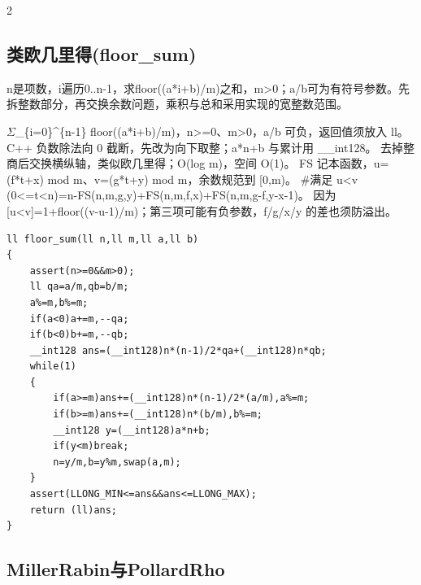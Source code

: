 \documentclass[UTF8,fontset=fandol,a4paper,twoside]{ctexart}
\newcommand{\note}[1]{{\fontsize{10}{12}\selectfont #1\par}}
\begin{document}
\begin{multicols}{2}
\subsection{类欧几里得(floor\_sum)}

\note{n是项数，i遍历0.\allowbreak{}.\allowbreak{}n-\allowbreak{}1，求floor(\allowbreak{}(\allowbreak{}a*i+\allowbreak{}b)\allowbreak{}/\allowbreak{}m)\allowbreak{}之和，m>\allowbreak{}0；a/\allowbreak{}b可为有符号参数。先拆整数部分，再交换余数问题，乘积与总和采用实现的宽整数范围。}
\note{\ensuremath{\Sigma}\_\{i=\allowbreak{}0\}\textasciicircum{}\{n-\allowbreak{}1\} floor(\allowbreak{}(\allowbreak{}a*i+\allowbreak{}b)\allowbreak{}/\allowbreak{}m)\allowbreak{}，n>\allowbreak{}=\allowbreak{}0、m>\allowbreak{}0，a/\allowbreak{}b 可负，返回值须放入 ll。 C+\allowbreak{}+\allowbreak{} 负数除法向 0 截断，先改为向下取整；a*n+\allowbreak{}b 与累计用 \_\_int128。 去掉整商后交换横纵轴，类似欧几里得；O(\allowbreak{}log m)\allowbreak{}，空间 O(\allowbreak{}1)\allowbreak{}。 FS 记本函数，u=\allowbreak{}(\allowbreak{}f*t+\allowbreak{}x)\allowbreak{} mod m、v=\allowbreak{}(\allowbreak{}g*t+\allowbreak{}y)\allowbreak{} mod m，余数规范到 [\allowbreak{}0,\allowbreak{}m)\allowbreak{}。 \#满足 u<\allowbreak{}v (\allowbreak{}0<\allowbreak{}=\allowbreak{}t<\allowbreak{}n)\allowbreak{}=\allowbreak{}n-\allowbreak{}FS(\allowbreak{}n,\allowbreak{}m,\allowbreak{}g,\allowbreak{}y)\allowbreak{}+\allowbreak{}FS(\allowbreak{}n,\allowbreak{}m,\allowbreak{}f,\allowbreak{}x)\allowbreak{}+\allowbreak{}FS(\allowbreak{}n,\allowbreak{}m,\allowbreak{}g-\allowbreak{}f,\allowbreak{}y-\allowbreak{}x-\allowbreak{}1)\allowbreak{}。 因为 [\allowbreak{}u<\allowbreak{}v]\allowbreak{}=\allowbreak{}1+\allowbreak{}floor(\allowbreak{}(\allowbreak{}v-\allowbreak{}u-\allowbreak{}1)\allowbreak{}/\allowbreak{}m)\allowbreak{}；第三项可能有负参数，f/\allowbreak{}g/\allowbreak{}x/\allowbreak{}y 的差也须防溢出。}
\begin{lstlisting}
ll floor_sum(ll n,ll m,ll a,ll b)
{
    assert(n>=0&&m>0);
    ll qa=a/m,qb=b/m;
    a%=m,b%=m;
    if(a<0)a+=m,--qa;
    if(b<0)b+=m,--qb;
    __int128 ans=(__int128)n*(n-1)/2*qa+(__int128)n*qb;
    while(1)
    {
        if(a>=m)ans+=(__int128)n*(n-1)/2*(a/m),a%=m;
        if(b>=m)ans+=(__int128)n*(b/m),b%=m;
        __int128 y=(__int128)a*n+b;
        if(y<m)break;
        n=y/m,b=y%m,swap(a,m);
    }
    assert(LLONG_MIN<=ans&&ans<=LLONG_MAX);
    return (ll)ans;
}
\end{lstlisting}
\subsection{MillerRabin与PollardRho}


\end{multicols}
\end{document}
